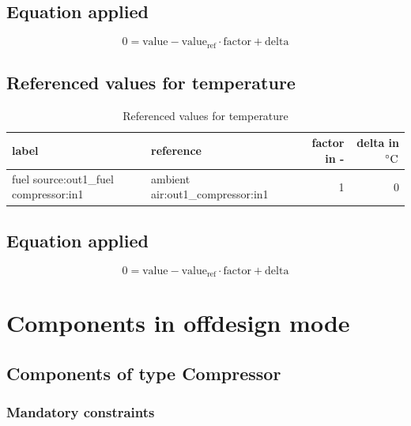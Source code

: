 \subsection{Equation applied}

\begin{equation}
\label{eq:Connection_ref}
0 = \text{value} - \text{value}_\mathrm{ref} \cdot \mathrm{factor} + \text{delta}
\end{equation}

\subsection{Referenced values for temperature}

\begin{table}[H]\begin{center}
\begin{tabular}{llrr}
\toprule
                                 label &                         reference &  factor in - &  delta in $\unit[]{^\circ C}$ \\
\midrule
 fuel source:out1\_fuel compressor:in1 &  ambient air:out1\_compressor:in1 &            1 &                             0 \\
\bottomrule
\end{tabular}
\caption{Referenced values for temperature}
\end{center}\end{table}

\subsection{Equation applied}

\begin{equation}
\label{eq:Connection_ref}
0 = \text{value} - \text{value}_\mathrm{ref} \cdot \mathrm{factor} + \text{delta}
\end{equation}

\section{Components in offdesign mode}

\subsection{Components of type Compressor}

\subsubsection{Mandatory constraints}

